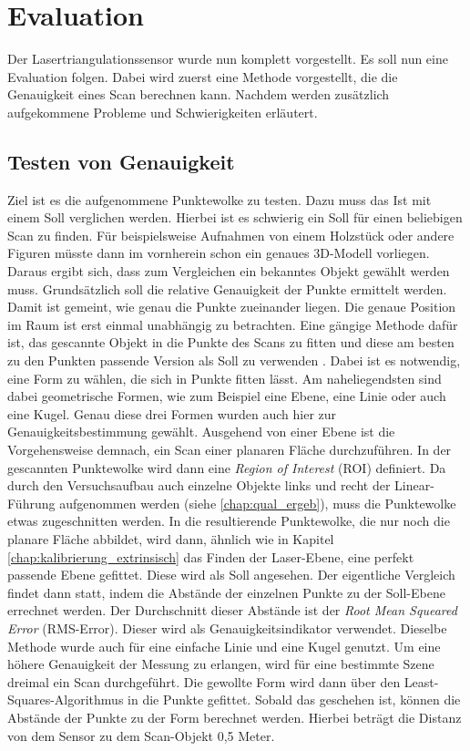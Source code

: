 \section{Evaluation}
		
		Der Lasertriangulationssensor wurde nun komplett vorgestellt. Es soll nun eine Evaluation folgen. Dabei wird zuerst eine Methode vorgestellt, die die Genauigkeit eines Scan berechnen kann. Nachdem werden zusätzlich aufgekommene Probleme und Schwierigkeiten erläutert.   
		\subsection{Testen von Genauigkeit}
		Ziel ist es die aufgenommene Punktewolke zu testen. Dazu muss das \glqq Ist\grqq{} mit einem \glqq Soll\grqq{} verglichen werden. Hierbei ist es schwierig ein \glqq Soll\grqq{} für einen beliebigen Scan zu finden. Für beispielsweise Aufnahmen von einem Holzstück oder andere Figuren müsste dann im vornherein schon ein genaues 3D-Modell vorliegen. Daraus ergibt sich, dass zum Vergleichen ein bekanntes Objekt gewählt werden muss. Grundsätzlich soll die relative Genauigkeit der Punkte ermittelt werden. Damit ist gemeint, wie genau die Punkte zueinander liegen. Die genaue Position im Raum ist erst einmal unabhängig zu betrachten. Eine gängige Methode dafür ist, das gescannte Objekt in die Punkte des Scans zu fitten und diese am besten zu den Punkten passende Version als \glqq Soll\grqq{} zu verwenden \citep[vgl.][]{boeckmans_accuracy_2013} \citep[vgl.][]{song_multi-view_stereo_measurment}. Dabei ist es notwendig, eine Form zu wählen, die sich in Punkte fitten lässt. Am naheliegendsten sind dabei geometrische Formen, wie zum Beispiel eine Ebene, eine Linie oder auch eine Kugel. Genau diese drei Formen wurden auch hier zur Genauigkeitsbestimmung gewählt. Ausgehend von einer Ebene ist die  Vorgehensweise demnach, ein Scan einer planaren Fläche durchzuführen. In der gescannten Punktewolke wird dann eine \textit{Region of Interest} (ROI) definiert. Da durch den Versuchsaufbau auch einzelne Objekte links und recht der Linear-Führung aufgenommen werden (siehe \ref{chap:qual_ergeb}), muss die Punktewolke etwas zugeschnitten werden. In die resultierende Punktewolke, die nur noch die planare Fläche abbildet, wird dann, ähnlich wie in Kapitel \ref{chap:kalibrierung_extrinsisch} das Finden der Laser-Ebene, eine perfekt passende Ebene gefittet. Diese wird als \glqq Soll\grqq{} angesehen. Der eigentliche Vergleich findet dann statt, indem die Abstände der einzelnen Punkte zu der \glqq Soll\grqq-Ebene errechnet werden. Der Durchschnitt dieser Abstände ist der \textit{Root Mean Squeared Error} (RMS-Error). Dieser wird als Genauigkeitsindikator verwendet. Dieselbe Methode wurde auch für eine einfache Linie und eine Kugel genutzt. Um eine höhere Genauigkeit der Messung zu erlangen, wird für eine bestimmte Szene dreimal ein Scan durchgeführt. Die gewollte Form wird dann über den Least-Squares-Algorithmus in die Punkte gefittet. Sobald das geschehen ist, können die Abstände der Punkte zu der Form berechnet werden. Hierbei beträgt die Distanz von dem Sensor zu dem Scan-Objekt 0,5 Meter. \newline
